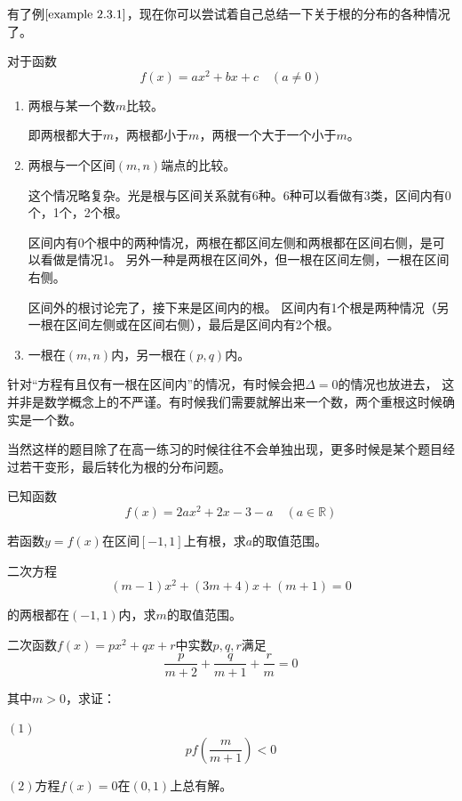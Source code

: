 有了例$\ref*{example 2.3.1}$，现在你可以尝试着自己总结一下关于根的分布的各种情况了。

对于函数\[f(x)=ax^2+bx+c\quad(a\neq0)\]
\begin{enumerate}
    \item 两根与某一个数$m$比较。
    
    即两根都大于$m$，两根都小于$m$，两根一个大于一个小于$m$。

    \item 两根与一个区间$(m,n)$端点的比较。
    
    这个情况略复杂。光是根与区间关系就有6种。6种可以看做有3类，区间内有0个，1个，2个根。

    区间内有0个根中的两种情况，两根在都区间左侧和两根都在区间右侧，是可以看做是情况1。
    另外一种是两根在区间外，但一根在区间左侧，一根在区间右侧。

    区间外的根讨论完了，接下来是区间内的根。
    区间内有1个根是两种情况（另一根在区间左侧或在区间右侧），最后是区间内有2个根。
    \item 一根在$(m,n)$内，另一根在$(p,q)$内。
\end{enumerate}

\begin{zhu}
    针对“方程有且仅有一根在区间内”的情况，有时候会把$\Delta=0$的情况也放进去，
    这并非是数学概念上的不严谨。有时候我们需要就解出来一个数，两个重根这时候确实是一个数。
\end{zhu}

当然这样的题目除了在高一练习的时候往往不会单独出现，更多时候是某个题目经过若干变形，最后转化为根的分布问题。
\begin{exercise}
    已知函数\[f(x)=2ax^2+2x-3-a\quad(a\in \mathbb{R} )\]

    若函数$y=f(x)$在区间$[-1,1]$上有根，求$a$的取值范围。
\end{exercise}
\begin{exercise}
    二次方程\[(m-1)x^2+(3m+4)x+(m+1)=0 \]

    的两根都在$(-1,1)$内，求$m$的取值范围。
\end{exercise}
\begin{exercise}
    二次函数$f(x)=px^2+qx+r$中实数$p,q,r$满足
    \[\frac{p}{m+2}+\frac{q}{m+1}+\frac{r}{m}=0\]

    其中$m>0$，求证：

    $(1)$\[pf(\frac{m}{m+1})<0\]

    $(2)$方程$f(x)=0$在$(0,1)$上总有解。
\end{exercise}










